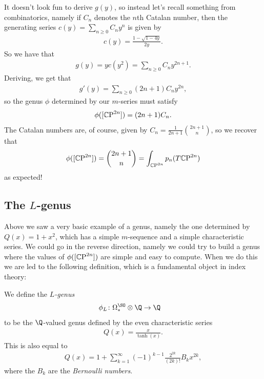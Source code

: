 \documentclass[11pt]{book}
\begin{document}
\begin{example}
It doesn't look fun to derive $g(y)$, so instead let's recall something from combinatorics, namely if $C_n$ denotes the $n$th Catalan number, then the generating series $c(y) = \sum_{n\ge0} C_n y^n$ is given by
\begin{align*}
    c(y) = \frac{1 - \sqrt{1-4y}}{2y}.
\end{align*}
So we have that
\begin{align*}
    g(y) = y c(y^2) = \sum_{n\ge0} C_n y^{2n+1}.
\end{align*}
Deriving, we get that
\begin{align*}
    g'(y) = \sum_{n\ge0} (2n+1) C_n y^{2n},
\end{align*}
so the genus $\phi$ determined by our $m$-series must satisfy
\begin{align*}
    \phi([{\mathbb{C}\text{P}}^{2n}]) = (2n+1)C_n.
\end{align*}
The Catalan numbers are, of course, given by $C_n = \frac{1}{2n+1} \binom{2n+1}{n}$, so we recover that
\begin{align*}
    \phi([{\mathbb{C}\text{P}}^{2n}]) = \binom{2n+1}{n} = \int_{{\mathbb{C}\text{P}}^{2n}}p_n(T{\mathbb{C}\text{P}}^{2n})
\end{align*}
as expected!
\end{example}

\subsection{The $L$-genus}

Above we saw a very basic example of a genus, namely the one determined by $Q(x) = 1+x^2$, which has a simple $m$-sequence and a simple characteristic series. We could go in the reverse direction, namely we could try to build a genus where the values of $\phi([{\mathbb{C}\text{P}}^{2n}])$ are simple and easy to compute. When we do this we are led to the following definition, which is a fundamental object in index theory:

\begin{definition}\label{def:L-genus} We define the \emph{$L$-genus}
\begin{align*}
    \phi_L \colon \Omega^{\SO}_\ast \otimes \Q &\to \Q
\end{align*}
to be the $\Q$-valued genus defined by the even characteristic series
\begin{align*}
    Q(x) = \frac{x}{\tanh(x)}.
\end{align*}
This is also equal to
\begin{align*}
    Q(x) =1 + \sum_{k=1}^\infty (-1)^{k-1} \frac{2^{2k}}{(2k)!}B_k x^{2k},
\end{align*}
where the $B_k$ are the \emph{Bernoulli numbers}.
\end{definition}
\end{document}
